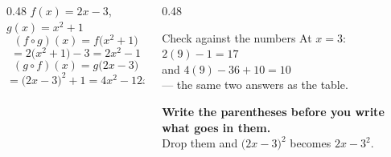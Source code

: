 \documentclass[aspectratio=169, 11pt]{beamer}
\begin{document}
\begin{frame}[t, plain]
  \begin{columns}[T]
    \begin{column}{0.48\textwidth}
      \footnotesize
      $f(x)=2x-3$, \quad $g(x)=x^{2}+1$
      \vspace{4pt}
      \[ (f\circ g)(x)=f\big(x^{2}+1\big) \]
      \[ =2\big(x^{2}+1\big)-3=2x^{2}-1 \]
      \vspace{-6pt}
      \[ (g\circ f)(x)=g\big(2x-3\big) \]
      \[ =\big(2x-3\big)^{2}+1=4x^{2}-12x+10 \]
    \end{column}
    \begin{column}{0.48\textwidth}
      \footnotesize
      \begin{block}{Check against the numbers}
        At $x=3$: $2(9)-1=17$ \checkmark \\[3pt]
        and $4(9)-36+10=10$ \checkmark \\[3pt]
        --- the same two answers as the table.
      \end{block}
      \vspace{4pt}
      \begin{center}
      \textbf{Write the parentheses before you write what goes in them.} \\[3pt]
      Drop them and $\big(2x-3\big)^{2}$ becomes $2x-3^{2}$.
      \end{center}
    \end{column}
  \end{columns}
\end{frame}
\end{document}
